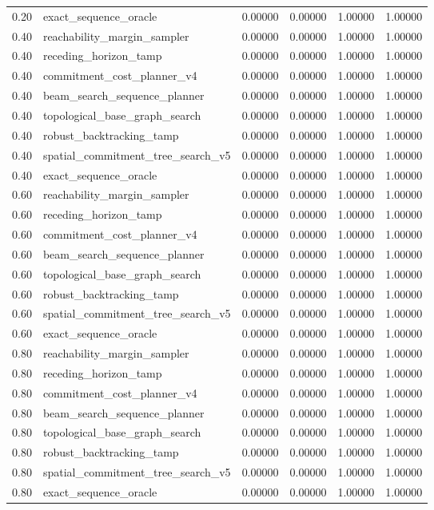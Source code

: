 \documentclass{article}
\begin{document}
\begin{table}[tbp]
{\begin{tabular}{llllll}
0.20 & exact\_sequence\_oracle & 0.00000 & 0.00000 & 1.00000 & 1.00000 \\
0.40 & reachability\_margin\_sampler & 0.00000 & 0.00000 & 1.00000 & 1.00000 \\
0.40 & receding\_horizon\_tamp & 0.00000 & 0.00000 & 1.00000 & 1.00000 \\
0.40 & commitment\_cost\_planner\_v4 & 0.00000 & 0.00000 & 1.00000 & 1.00000 \\
0.40 & beam\_search\_sequence\_planner & 0.00000 & 0.00000 & 1.00000 & 1.00000 \\
0.40 & topological\_base\_graph\_search & 0.00000 & 0.00000 & 1.00000 & 1.00000 \\
0.40 & robust\_backtracking\_tamp & 0.00000 & 0.00000 & 1.00000 & 1.00000 \\
0.40 & spatial\_commitment\_tree\_search\_v5 & 0.00000 & 0.00000 & 1.00000 & 1.00000 \\
0.40 & exact\_sequence\_oracle & 0.00000 & 0.00000 & 1.00000 & 1.00000 \\
0.60 & reachability\_margin\_sampler & 0.00000 & 0.00000 & 1.00000 & 1.00000 \\
0.60 & receding\_horizon\_tamp & 0.00000 & 0.00000 & 1.00000 & 1.00000 \\
0.60 & commitment\_cost\_planner\_v4 & 0.00000 & 0.00000 & 1.00000 & 1.00000 \\
0.60 & beam\_search\_sequence\_planner & 0.00000 & 0.00000 & 1.00000 & 1.00000 \\
0.60 & topological\_base\_graph\_search & 0.00000 & 0.00000 & 1.00000 & 1.00000 \\
0.60 & robust\_backtracking\_tamp & 0.00000 & 0.00000 & 1.00000 & 1.00000 \\
0.60 & spatial\_commitment\_tree\_search\_v5 & 0.00000 & 0.00000 & 1.00000 & 1.00000 \\
0.60 & exact\_sequence\_oracle & 0.00000 & 0.00000 & 1.00000 & 1.00000 \\
0.80 & reachability\_margin\_sampler & 0.00000 & 0.00000 & 1.00000 & 1.00000 \\
0.80 & receding\_horizon\_tamp & 0.00000 & 0.00000 & 1.00000 & 1.00000 \\
0.80 & commitment\_cost\_planner\_v4 & 0.00000 & 0.00000 & 1.00000 & 1.00000 \\
0.80 & beam\_search\_sequence\_planner & 0.00000 & 0.00000 & 1.00000 & 1.00000 \\
0.80 & topological\_base\_graph\_search & 0.00000 & 0.00000 & 1.00000 & 1.00000 \\
0.80 & robust\_backtracking\_tamp & 0.00000 & 0.00000 & 1.00000 & 1.00000 \\
0.80 & spatial\_commitment\_tree\_search\_v5 & 0.00000 & 0.00000 & 1.00000 & 1.00000 \\
0.80 & exact\_sequence\_oracle & 0.00000 & 0.00000 & 1.00000 & 1.00000 \\
\bottomrule
\end{tabular}
}
\end{table}
\end{document}
